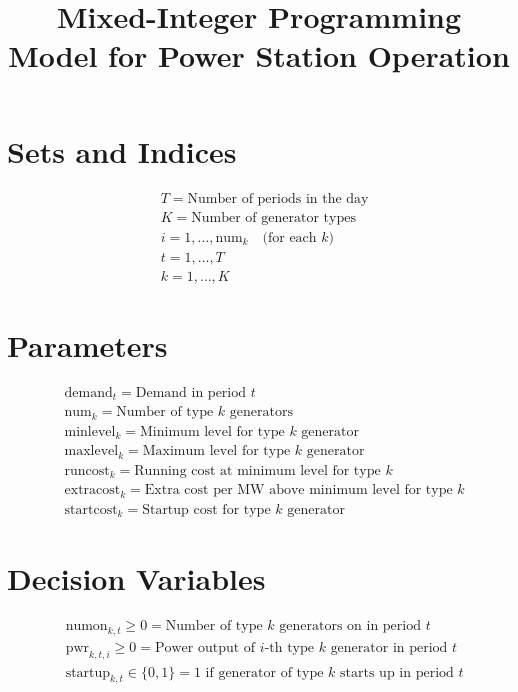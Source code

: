 \documentclass{article}
\begin{document}
\title{Mixed-Integer Programming Model for Power Station Operation}
\date{}
\maketitle

\section*{Sets and Indices}
\begin{align*}
& T = \text{Number of periods in the day} \\
& K = \text{Number of generator types} \\
& i = 1, \ldots, \text{num}_k \quad \text{(for each $k$)}\\
& t = 1, \ldots, T \\
& k = 1, \ldots, K
\end{align*}

\section*{Parameters}
\begin{align*}
& \text{demand}_t = \text{Demand in period } t \\
& \text{num}_k = \text{Number of type } k \text{ generators} \\
& \text{minlevel}_k = \text{Minimum level for type } k \text{ generator} \\
& \text{maxlevel}_k = \text{Maximum level for type } k \text{ generator} \\
& \text{runcost}_k = \text{Running cost at minimum level for type } k\\
& \text{extracost}_k = \text{Extra cost per MW above minimum level for type } k \\
& \text{startcost}_k = \text{Startup cost for type } k \text{ generator}
\end{align*}

\section*{Decision Variables}
\begin{align*}
& \text{numon}_{k,t} \geq 0 = \text{Number of type } k \text{ generators on in period } t \\
& \text{pwr}_{k,t,i} \geq 0 = \text{Power output of } i\text{-th type } k\text{ generator in period } t \\
& \text{startup}_{k,t} \in \{0, 1\} = \text{1 if generator of type } k \text{ starts up in period } t
\end{align*}
\end{document}
